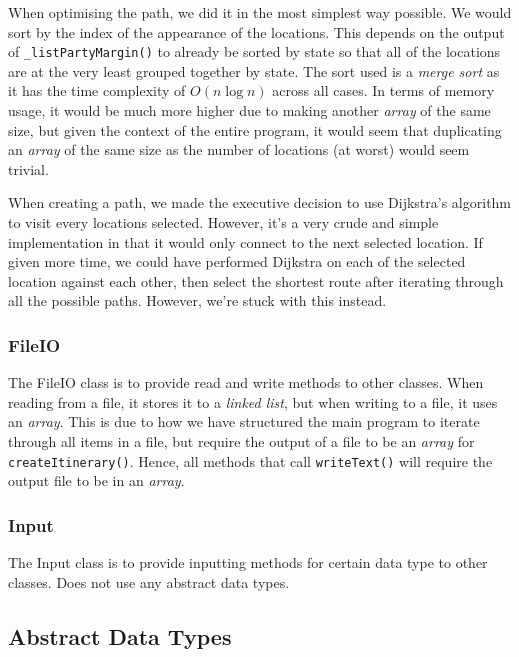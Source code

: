 \documentclass[a4paper, 12pt, titlepage]{article}
\newcommand{\code}[1]{\small\texttt{#1}\normalsize}
\begin{document}
When optimising the path, we did it in the most simplest way possible. We
would sort by the index of the appearance of the locations. This depends on
the output of \code{\_listPartyMargin()} to already be sorted by state so that
all of the locations are at the very least grouped together by state. The sort
used is a \textit{merge sort} as it has the time complexity of $O(n\log{}n)$
across all cases. In terms of memory usage, it would be much more higher due
to making another \textit{array} of the same size, but given the context of
the entire program, it would seem that duplicating an \textit{array} of the
same size as the number of locations (at worst) would seem trivial.

When creating a path, we made the executive decision to use Dijkstra's
algorithm to visit every locations selected. However, it's a very crude and
simple implementation in that it would only connect to the next selected
location. If given more time, we could have performed Dijkstra on each of
the selected location against each other, then select the shortest route
after iterating through all the possible paths. However, we're stuck with
this instead.

\subsubsection{FileIO}

The FileIO class is to provide read and write methods to other classes.
When reading from a file, it stores it to a \textit{linked list}, but
when writing to a file, it uses an \textit{array}. This is due to how
we have structured the main program to iterate through all items in a file,
but require the output of a file to be an \textit{array} for
\code{createItinerary()}. Hence, all methods that call \code{writeText()} will
require the output file to be in an \textit{array}.

\subsubsection{Input}

The Input class is to provide inputting methods for certain data type to other
classes. Does not use any abstract data types.

\newpage

\subsection{Abstract Data Types}
\end{document}
